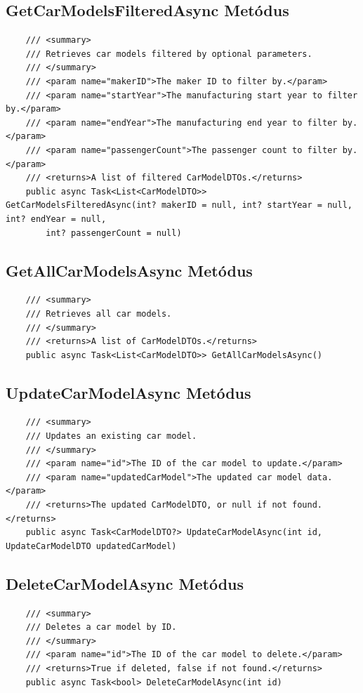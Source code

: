 \documentclass{report}[11pt]
\begin{document}
\subsection*{GetCarModelsFilteredAsync Metódus}
\begin{lstlisting}
    /// <summary>
    /// Retrieves car models filtered by optional parameters.
    /// </summary>
    /// <param name="makerID">The maker ID to filter by.</param>
    /// <param name="startYear">The manufacturing start year to filter by.</param>
    /// <param name="endYear">The manufacturing end year to filter by.</param>
    /// <param name="passengerCount">The passenger count to filter by.</param>
    /// <returns>A list of filtered CarModelDTOs.</returns>
    public async Task<List<CarModelDTO>> GetCarModelsFilteredAsync(int? makerID = null, int? startYear = null, int? endYear = null,
        int? passengerCount = null)
\end{lstlisting}

\subsection*{GetAllCarModelsAsync Metódus}
\begin{lstlisting}
    /// <summary>
    /// Retrieves all car models.
    /// </summary>
    /// <returns>A list of CarModelDTOs.</returns>
    public async Task<List<CarModelDTO>> GetAllCarModelsAsync()
\end{lstlisting}

\subsection*{UpdateCarModelAsync Metódus}
\begin{lstlisting}
    /// <summary>
    /// Updates an existing car model.
    /// </summary>
    /// <param name="id">The ID of the car model to update.</param>
    /// <param name="updatedCarModel">The updated car model data.</param>
    /// <returns>The updated CarModelDTO, or null if not found.</returns>
    public async Task<CarModelDTO?> UpdateCarModelAsync(int id, UpdateCarModelDTO updatedCarModel)
\end{lstlisting}

\subsection*{DeleteCarModelAsync Metódus}
\begin{lstlisting}
    /// <summary>
    /// Deletes a car model by ID.
    /// </summary>
    /// <param name="id">The ID of the car model to delete.</param>
    /// <returns>True if deleted, false if not found.</returns>
    public async Task<bool> DeleteCarModelAsync(int id)
\end{lstlisting}
\end{document}
